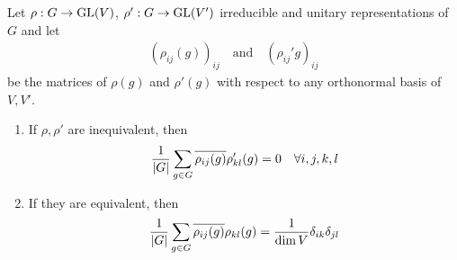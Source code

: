 \begin{thm}[]
  Let $\rho: G \to \operatorname{GL}(V)$, $\rho': G \to \operatorname{GL}(V')$ irreducible and unitary representations of $G$ and let
  \begin{align*}
    (\rho_{ij}(g))_{ij} \quad \text{and} \quad (\rho_{ij}'g)_{ij}
  \end{align*}
  be the matrices of $\rho(g)$ and $\rho'(g)$ with respect to any orthonormal basis of $V,V'$.

  \begin{enumerate}
    \item If $\rho,\rho'$ are inequivalent, then
      \begin{align*}
        \frac{1}{\vert G\vert} \sum_{g \in G}\overline{\rho_{ij}(g)}\rho_{kl}'(g) = 0 \quad \forall i,j,k,l
      \end{align*}
    \item If they are equivalent, then
      \begin{align*}
        \frac{1}{\vert G\vert} \sum_{g \in G}\overline{\rho_{ij}(g)}\rho_{kl}(g) = \frac{1}{\dim V} \delta_{ik}\delta_{jl}
      \end{align*}
  \end{enumerate}
\end{thm}
